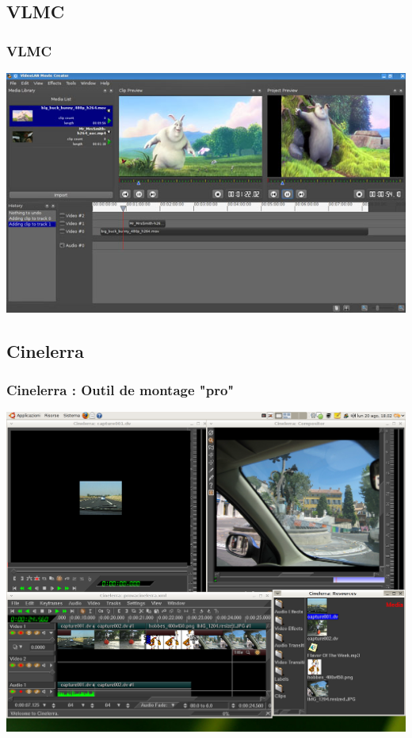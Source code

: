\subsection{VLMC}
\begin{frame}
 \frametitle{VLMC}
  \includegraphics[scale=0.60]{ressources/vlmc.jpg}
\end{frame}

\subsection{Cinelerra}
\begin{frame}
 \frametitle{Cinelerra : Outil de montage "pro"}
  \includegraphics[scale=0.20]{ressources/cinelerra.png}
\end{frame}

